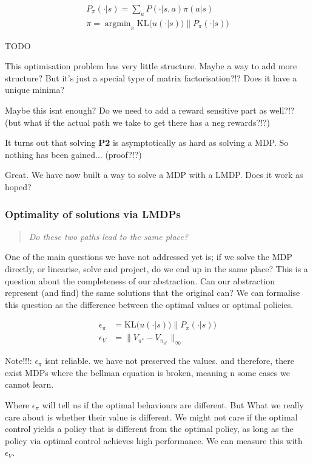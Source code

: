 \begin{align}
P_{\pi}(\cdot | s) = \sum_a P(\cdot | s, a) \pi(a | s) \\
\pi = \mathop{\text{argmin}}_{\pi} \text{KL}\Big(u(\cdot | s))\parallel P_{\pi}(\cdot | s)\Big)
\end{align}

{\color{red}TODO}

This optimisation problem has very little structure.
Maybe a way to add more structure?
But it's just a special type of matrix factorisation?!? Does it have a unique minima?

Maybe this isnt enough? Do we need to add a reward sensitive part as
well?!? (but what if the actual path we take to get there has a neg
rewards?!?)

It turns out that solving \textbf{P2} is asymptotically as hard as solving a MDP.
So nothing has been gained... (proof?!?)

Great. We have now built a way to solve a MDP with a LMDP. Does it work as hoped?

\subsubsection{Optimality of solutions via LMDPs}

\begin{quote}
\textit{Do these two paths lead to the same place?}
\end{quote}

One of the main questions we have not addressed yet is; if we solve the
MDP directly, or linearise, solve and project, do we end up in the same
place? This is a question about the completeness of our abstraction. Can
our abstraction represent (and find) the same solutions that the
original can? We can formalise this question as the difference between the optimal values or optimal policies.

\begin{align*}
\epsilon_{\pi} &= \text{KL}\Big(u(\cdot | s))\parallel P_{\pi}(\cdot | s)\Big) \\
\epsilon_{V} &= \parallel V_{\pi^{* }} - V_{\pi_{u^{* }}} \parallel_{\infty}
\end{align*}

{\color{red}Note!!!: $\epsilon_{\pi}$ isnt reliable. we have not preserved the values.
and therefore, there exist MDPs where the bellman equation is broken, meaning n some cases we cannot learn.}

Where $\epsilon_{\pi}$ will tell us if the optimal behaviours are different. But What we really care about
is whether their value is different. We might not care if the optimal control
yields a policy that is different from the optimal policy, as long as the
policy via optimal control achieves high performance. We can measure this with $\epsilon_{V}$.

